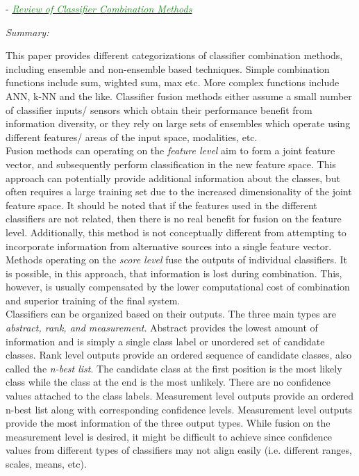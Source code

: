 \documentclass[]{article}
\newcommand{\paperentry}[4]{
            \hangindent=1cm
            \textcolor{red}{\cite{#1}} - \href{run:../References/#3}{\textcolor{ForestGreen}{\textit{#2}}}
            
            \noindent            
            \begin{minipage}[t]{0.1\linewidth}\hfill\end{minipage}
            \begin{minipage}[t]{0.8\linewidth}\textcolor{NavyBlue}{{\textit{Summary:}}}#4\end{minipage}
            \vspace{.25cm}
          }
\begin{document}
			
			\paperentry{Tulyakov2008ReviewClassifierCombinationMethods}
			{Review of Classifier Combination Methods}
			{Fusion/Reviews/Tulyakov2008ReviewClassifierCombinationMethods.pdf}
			{}\newline
			This paper provides different categorizations of classifier combination methods, including ensemble and non-ensemble based techniques.  Simple combination functions include sum, wighted sum, max etc.  More complex functions include ANN, k-NN and the like.  Classifier fusion methods either assume a small number of classifier inputs/ sensors which obtain their performance benefit from information diversity, or they rely on large sets of ensembles which operate using different features/ areas of the input space, modalities, etc.  \\
			\noindent
			Fusion methods can operating on the \textit{feature level} aim to form a joint feature vector, and subsequently perform classification in the new feature space.  This approach can potentially provide additional information about the classes, but often requires a large training set due to the increased dimensionality of the joint feature space.  It should be noted that if the features used in the different classifiers are not related, then there is no real benefit for fusion on the feature level. Additionally, this method is not conceptually different from attempting to incorporate information from alternative sources into a single feature vector.\\
			\noindent
			Methods operating on the \textit{score level} fuse the outputs of individual classifiers.  It is possible, in this approach, that information is lost during combination.  This, however, is usually compensated by the lower computational cost of combination and superior training of the final system.  \\
			\noindent
			Classifiers can be organized based on their outputs.  The three main types are \textit{abstract, rank, and measurement}.  Abstract provides the lowest amount of information and is simply a single class label or unordered set of candidate classes.  Rank level outputs provide an ordered sequence of candidate classes, also called the \textit{n-best list}.  The candidate class at the first position is the most likely class while the class at the end is the most unlikely.  There are no confidence values attached to the class labels.  Measurement level outputs provide an ordered n-best  list along with corresponding confidence levels.  Measurement level outputs provide the most information of the three output types.  While fusion on the measurement level is desired, it might be difficult to achieve  since confidence values from different types of classifiers may not align easily (i.e. different ranges, scales, means, etc).\\
\end{document}
